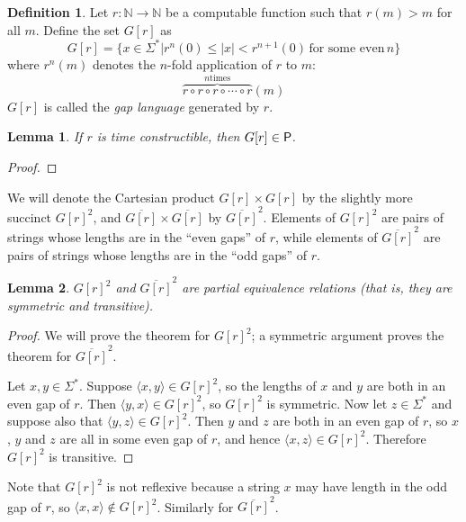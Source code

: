 \documentclass{article}
\newtheorem{lemma}[lemma]{Lemma}
\theoremstyle{definition} \newtheorem{definition}[definition]{Definition}
\newcommand{\plain}[1]{\,\text{#1}\,} %
\newcommand{\defn}[1]{\emph{#1}} %
\newcommand{\pair}[2]{\langle#1,#2\rangle} %
\begin{document}
\begin{definition}
  Let $r\colon\mathbb{N}\to\mathbb{N}$ be a computable function such that
  $r(m)>m$ for all $m$. Define the set $G[r]$ as
  \begin{displaymath}
    G[r]=\{x\in\Sigma^*|r^n(0)\leq|x|<r^{n+1}(0) \plain{for some even} n\}
  \end{displaymath}
  where $r^n(m)$ denotes the $n$-fold application of $r$ to $m$:
  \begin{displaymath}
    \overbrace{r\circ r\circ r\circ\cdots\circ r}^{n \text{times}}(m)
  \end{displaymath}
  $G[r]$ is called the \defn{gap language} generated by $r$.
\end{definition}

\begin{lemma}\label{lem:gap_p}
  If $r$ is time constructible, then $G[r]\in\P$.
\end{lemma}
\begin{proof}
\end{proof}

We will denote the Cartesian product $G[r]\times G[r]$ by the slightly more
succinct ${G[r]}^2$, and $\overline{G[r]}\times\overline{G[r]}$ by
$\overline{G[r]}^2$. Elements of ${G[r]}^2$ are pairs of strings whose lengths
are in the ``even gaps'' of $r$, while elements of $\overline{G[r]}^2$ are
pairs of strings whose lengths are in the ``odd gaps'' of $r$.

\begin{lemma}
  ${G[r]}^2$ and $\overline{G[r]}^2$ are partial equivalence relations (that
  is, they are symmetric and transitive).
\end{lemma}
\begin{proof}
  We will prove the theorem for ${G[r]}^2$; a symmetric argument proves the
  theorem for $\overline{G[r]}^2$.

  Let $x,y\in\Sigma^*$. Suppose $\pair{x}{y}\in {G[r]}^2$, so the lengths of
  $x$ and $y$ are both in an even gap of $r$. Then $\pair{y}{x}\in{G[r]}^2$, so
  ${G[r]}^2$ is symmetric. Now let $z\in\Sigma^*$ and suppose also that
  $\pair{y}{z}\in {G[r]}^2$. Then $y$ and $z$ are both in an even gap of $r$,
  so $x$, $y$ and $z$ are all in some even gap of $r$, and hence
  $\pair{x}{z}\in {G[r]}^2$. Therefore ${G[r]}^2$ is transitive.
\end{proof}

Note that ${G[r]}^2$ is not reflexive because a string $x$ may have length in
the odd gap of $r$, so $\pair{x}{x}\notin{G[r]}^2$. Similarly for
$\overline{G[r]}^2$.
\end{document}
